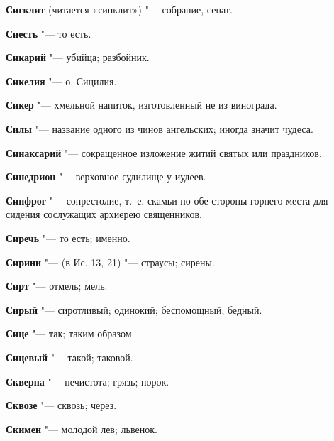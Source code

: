 \begin{mymulticols}{2}
\noindent\textbf{Сигклит} (читается «синклит») "--- собрание, сенат. 




\noindent\textbf{Сиесть} "--- то есть. 




\noindent\textbf{Сикарий} "--- убийца; разбойник. 




\noindent\textbf{Сикелия} "--- о. Сицилия. 




\noindent\textbf{Сикер} "--- хмельной напиток, изготовленный не из винограда. 




\noindent\textbf{Силы} "--- название одного из чинов ангельских; иногда значит чудеса. 




\noindent\textbf{Синаксарий} "--- сокращенное изложение житий святых или праздников. 




\noindent\textbf{Синедрион} "--- верховное судилище у иудеев. 




\noindent\textbf{Синфрог} "--- сопрестолие, т.~е. скамьи по обе стороны горнего места для сидения сослужащих архиерею священников. 




\noindent\textbf{Сиречь} "--- то есть; именно. 




\noindent\textbf{Сирини} "--- (в Ис. 13, 21) "--- страусы; сирены. 




\noindent\textbf{Сирт} "--- отмель; мель. 




\noindent\textbf{Сирый} "--- сиротливый; одинокий; беспомощный; бедный. 




\noindent\textbf{Сице} "--- так; таким образом. 




\noindent\textbf{Сицевый} "--- такой; таковой. 




\noindent\textbf{Скверна} "--- нечистота; грязь; порок. 




\noindent\textbf{Сквозе} "--- сквозь; через. 




\noindent\textbf{Скимен} "--- молодой лев; львенок. 





\end{mymulticols}
